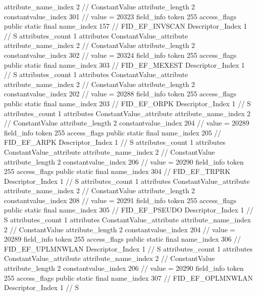 {{{{{{{					attribute_name_index	2		// ConstantValue
					attribute_length	2
					constantvalue_index	301		// value = 20323
				}
				}
			}
			field_info {
				token	255
				access_flags	public static final
				name_index	157		// FID_EF_INVSCAN
				Descriptor_Index	1		// S
				attributes_count	1
				attributes {
				ConstantValue_attribute {
					attribute_name_index	2		// ConstantValue
					attribute_length	2
					constantvalue_index	302		// value = 20324
				}
				}
			}
			field_info {
				token	255
				access_flags	public static final
				name_index	303		// FID_EF_MEXEST
				Descriptor_Index	1		// S
				attributes_count	1
				attributes {
				ConstantValue_attribute {
					attribute_name_index	2		// ConstantValue
					attribute_length	2
					constantvalue_index	202		// value = 20288
				}
				}
			}
			field_info {
				token	255
				access_flags	public static final
				name_index	203		// FID_EF_ORPK
				Descriptor_Index	1		// S
				attributes_count	1
				attributes {
				ConstantValue_attribute {
					attribute_name_index	2		// ConstantValue
					attribute_length	2
					constantvalue_index	204		// value = 20289
				}
				}
			}
			field_info {
				token	255
				access_flags	public static final
				name_index	205		// FID_EF_ARPK
				Descriptor_Index	1		// S
				attributes_count	1
				attributes {
				ConstantValue_attribute {
					attribute_name_index	2		// ConstantValue
					attribute_length	2
					constantvalue_index	206		// value = 20290
				}
				}
			}
			field_info {
				token	255
				access_flags	public static final
				name_index	304		// FID_EF_TRPRK
				Descriptor_Index	1		// S
				attributes_count	1
				attributes {
				ConstantValue_attribute {
					attribute_name_index	2		// ConstantValue
					attribute_length	2
					constantvalue_index	208		// value = 20291
				}
				}
			}
			field_info {
				token	255
				access_flags	public static final
				name_index	305		// FID_EF_PSEUDO
				Descriptor_Index	1		// S
				attributes_count	1
				attributes {
				ConstantValue_attribute {
					attribute_name_index	2		// ConstantValue
					attribute_length	2
					constantvalue_index	204		// value = 20289
				}
				}
			}
			field_info {
				token	255
				access_flags	public static final
				name_index	306		// FID_EF_UPLMNWLAN
				Descriptor_Index	1		// S
				attributes_count	1
				attributes {
				ConstantValue_attribute {
					attribute_name_index	2		// ConstantValue
					attribute_length	2
					constantvalue_index	206		// value = 20290
				}
				}
			}
			field_info {
				token	255
				access_flags	public static final
				name_index	307		// FID_EF_OPLMNWLAN
				Descriptor_Index	1		// S
}}}}}
